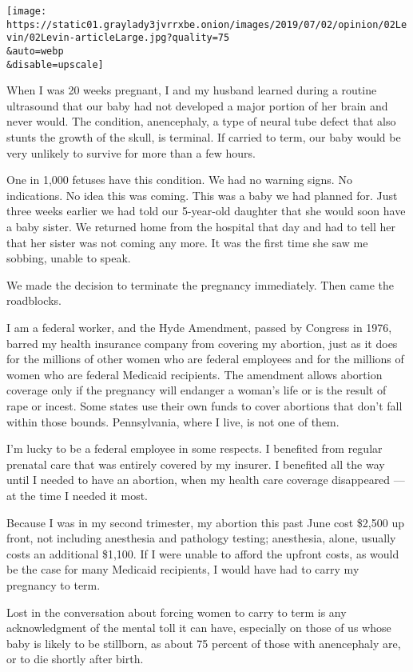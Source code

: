 \texttt{[image: https://static01.graylady3jvrrxbe.onion/images/2019/07/02/opinion/02Levin/02Levin-articleLarge.jpg?quality=75\\\&auto=webp\\\&disable=upscale]}

When I was 20 weeks pregnant, I and my husband learned during a routine
ultrasound that our baby had not developed a major portion of her brain
and never would. The condition, anencephaly, a type of neural tube
defect that also stunts the growth of the skull, is terminal. If carried
to term, our baby would be very unlikely to survive for more than a few
hours.

One in 1,000 fetuses have this condition. We had no warning signs. No
indications. No idea this was coming. This was a baby we had planned
for. Just three weeks earlier we had told our 5-year-old daughter that
she would soon have a baby sister. We returned home from the hospital
that day and had to tell her that her sister was not coming any more. It
was the first time she saw me sobbing, unable to speak.

We made the decision to terminate the pregnancy immediately. Then came
the roadblocks.

I am a federal worker, and the Hyde Amendment, passed by Congress in
1976, barred my health insurance company from covering my abortion, just
as it does for the millions of other women who are federal employees and
for the millions of women who are federal Medicaid recipients. The
amendment allows abortion coverage only if the pregnancy will endanger a
woman's life or is the result of rape or incest. Some states use their
own funds to cover abortions that don't fall within those bounds.
Pennsylvania, where I live, is not one of them.

I'm lucky to be a federal employee in some respects. I benefited from
regular prenatal care that was entirely covered by my insurer. I
benefited all the way until I needed to have an abortion, when my health
care coverage disappeared --- at the time I needed it most.

Because I was in my second trimester, my abortion this past June cost
\$2,500 up front, not including anesthesia and pathology testing;
anesthesia, alone, usually costs an additional \$1,100. If I were unable
to afford the upfront costs, as would be the case for many Medicaid
recipients, I would have had to carry my pregnancy to term.

Lost in the conversation about forcing women to carry to term is any
acknowledgment of the mental toll it can have, especially on those of us
whose baby is likely to be stillborn, as about 75 percent of those with
anencephaly are, or to die shortly after birth.

